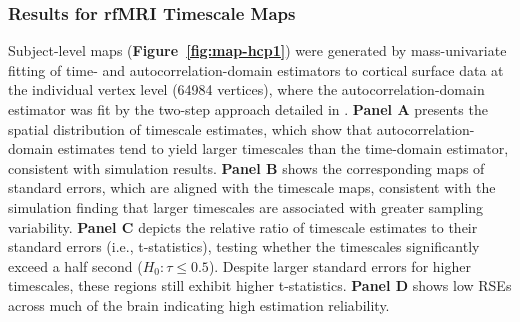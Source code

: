 \documentclass[9pt]{article}
\begin{document}
\subsubsection{Results for rfMRI Timescale Maps}
Subject-level maps (\textbf{Figure~\ref{fig:map-hcp1}}) were generated by mass-univariate fitting of time- and autocorrelation-domain estimators to cortical surface data at the individual vertex level (64984 vertices), where the autocorrelation-domain estimator was fit by the two-step approach detailed in . \textbf{Panel A} presents the spatial distribution of timescale estimates, which show that autocorrelation-domain estimates tend to yield larger timescales than the time-domain estimator, consistent with simulation results. \textbf{Panel B} shows the corresponding maps of standard errors, which are aligned with the timescale maps, consistent with the simulation finding that larger timescales are associated with greater sampling variability. \textbf{Panel C} depicts the relative ratio of timescale estimates to their standard errors (i.e., t-statistics), testing whether the timescales significantly exceed a half second ($H_0: \tau \leq 0.5$). Despite larger standard errors for higher timescales, these regions still exhibit higher t-statistics. \textbf{Panel D} shows low RSEs across much of the brain indicating high estimation reliability. \\
\end{document}
